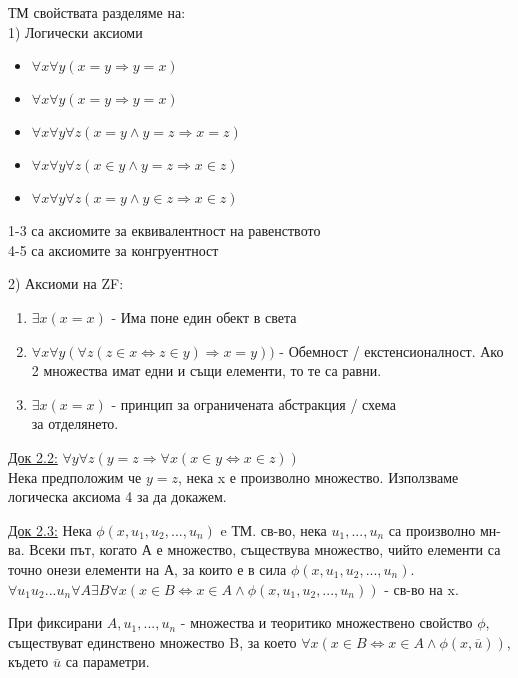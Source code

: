 \documentclass[fleqn, titlepage, 12pt]{report}
\begin{document}
ТМ свойствата разделяме на: \\
1) Логически аксиоми
\begin{itemize}
  \item $\forall{x}\forall{y}(x = y \Rightarrow y = x)$
  \item $\forall x \forall y (x = y \Rightarrow y = x)$
  \item $\forall{x}\forall{y}\forall{z}(x = y \land y = z \Rightarrow x = z)$
  \item $\forall{x}\forall{y}\forall{z}(x \in y \land y = z \Rightarrow x \in z)$
  \item $\forall{x}\forall{y}\forall{z}(x = y \land y \in z \Rightarrow x \in z)$
\end{itemize}
1-3 са аксиомите за еквивалентност на равенството\\
4-5 са аксиомите за конгруентност
\bigbreak

2) Аксиоми на ZF:
\begin{enumerate}
  \item $\exists{x}(x = x)$  - Има поне един обект в света
  \item $\forall{x}\forall{y}(\forall{z}(z \in x \Leftrightarrow z \in y) \Rightarrow x = y))$
- Обемност / екстенсионалност. Ако 2 множества имат едни и същи елементи, то те са равни.
  \item $\exists{x}(x = x)$ - принцип за ограничената абстракция / схема \\
    за отделянето.
\end{enumerate}
\underline{Док 2.2:} $\forall{y}\forall{z}(y = z \Rightarrow \forall{x}(x \in y \Leftrightarrow x \in z))$ \\
Нека предположим че $y = z$, нека x е произволно множество. Използваме логическа аксиома 4 за да докажем.
\bigbreak

\underline{Док 2.3:} Нека $\phi (x, u_1, u_2, ... , u_n)$ e ТМ. св-во, нека $u_1, ..., u_n$ са произволно мн-ва.
Всеки път, когато А е множество, съществува множество, чийто елементи са точно онези елементи на А, за които е в сила
$\phi (x, u_1, u_2, ..., u_n)$. \\
$\forall{u_1 u_2 ... u_n}\forall{A}\exists{B}\forall{x}(x \in B \Leftrightarrow x \in A \land \phi (
x, u_1, u_2, ..., u_n
)) $ - св-во на x.
\bigbreak

 При фиксирани $A, u_1, ..., u_n$ - множества и теоритико множествено свойство $\phi$,\\
съществуват единствено множество B, за което
$\forall{x}(x \in B \Leftrightarrow x \in A \land \phi (x, \overline{u}))$, където $\overline{u}$ са параметри.
\bigbreak
\end{document}
